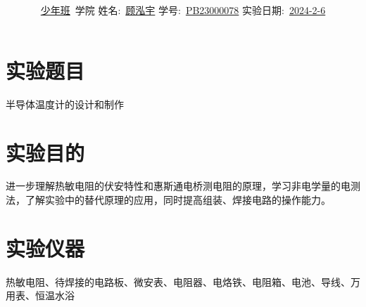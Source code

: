 \documentclass[12pt,a4paper]{article}
\title{\Huge{\textbf{\uuline{实\ 验\ 报\ 告}}}}
\author{\uline{少年班}\ 学院 \quad 姓名:\ \uline{顾泓宇} \quad 学号:\ \uline{PB23000078} \quad 实验日期:\ \uline{2024-2-6} }
\date{}
\begin{document}
	\maketitle
	
	\section{实验题目}
	半导体温度计的设计和制作
	
	\section{实验目的}
	进一步理解热敏电阻的伏安特性和惠斯通电桥测电阻的原理，学习非电学量的电测法，了解实验中的替代原理的应用，同时提高组装、焊接电路的操作能力。
	
	\section{实验仪器}
	热敏电阻、待焊接的电路板、微安表、电阻器、电烙铁、电阻箱、电池、导线、万用表、恒温水浴
	
\end{document}
